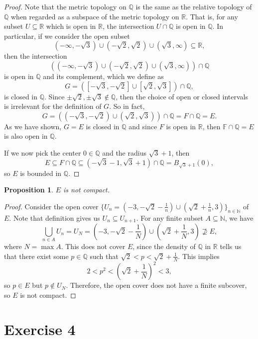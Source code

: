 \documentclass[12pt]{article}
\newtheorem{proposition}{Proposition}
\newcommand{\N}{\mathbb{N}}
\newcommand{\R}{\mathbb{R}}
\newcommand{\Q}{\mathbb{Q}}
\newcommand{\F}{\mathbb{F}}
\begin{document}
\begin{proof}
    Note that the metric topology on $\Q$ is the same as the relative topology of $\Q$ when regarded as a subspace of the metric topology on $\R$. That is, for any subset $U\subseteq\R$ which is open in $\R$, the intersection $U\cap\Q$ is open in $\Q$. In particular, if we consider the open subset
    \[(-\infty,-\sqrt{3})\cup(-\sqrt{2},\sqrt{2})\cup(\sqrt{3}, \infty)\subseteq\R,\]
    then the intersection
    \[\left((-\infty,-\sqrt{3})\cup(-\sqrt{2},\sqrt{2})\cup(\sqrt{3}, \infty)\right)\cap\Q\]
    is open in $\Q$ and its complement, which we define as
    \[G = \left([-\sqrt{3},-\sqrt{2}]\cup[\sqrt{2},\sqrt{3}]\right)\cap\Q,\]
    is closed in $\Q$. Since $\pm\sqrt{2},\pm\sqrt{3}\notin\Q$, then the choice of open or closed intervals is irrelevant for the definition of $G$. So in fact, 
    \[G = \left((-\sqrt{3},-\sqrt{2})\cup(\sqrt{2},\sqrt{3})\right)\cap\Q = F\cap\Q = E.\]
    As we have shown, $G=E$ is closed in $\Q$ and since $F$ is open in $\R$, then $\F\cap\Q=E$ is also open in $\Q$.
    
    If we now pick the center $0\in\Q$ and the radius $\sqrt{3}+1$, then
    \[E \subseteq F\cap\Q \subseteq (-\sqrt{3}-1,\sqrt{3}+1)\cap\Q = B_{\sqrt{3}+1}(0),\]
    so $E$ is bounded in $\Q$.
    
\end{proof}

\newpage
\begin{proposition}
    $E$ is not compact.
\end{proposition}

\begin{proof}
    Consider the open cover $\{U_n = (-3,-\sqrt{2}-\frac1n)\cup(\sqrt{2}+\frac1n, 3)\}_{n\in\N}$ of $E$. Note that definition gives us $U_n\subseteq U_{n+1}$. For any finite subset $A\subseteq\N$, we have
    \[\bigcup_{n\in A}U_n = U_N = (-3,-\sqrt{2}-\frac1N)\cup(\sqrt{2}+\frac1N, 3) \not\supseteq E,\]
    where $N=\max A$. This does not cover $E$, since the density of $\Q$ in $\R$ tells us that there exist some $p\in\Q$ such that $\sqrt{2} < p < \sqrt{2}+\frac1N$. This implies
    \[2 < p^2 < (\sqrt{2}+\frac1N)^2 < 3,\]
    so $p\in E$ but $p\notin U_N$. Therefore, the open cover does not have a finite subcover, so $E$ is not compact.

\end{proof}

\newpage
\section*{Exercise 4}
\end{document}
